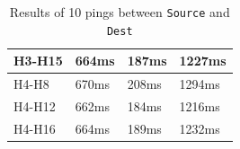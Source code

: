 \documentclass[a4paper, 11pt, oneside]{article}
\begin{document}
\begin{table}[H]
\begin{table}[H]
\begin{tabular}{|l|l|l|l|}
    H3-H15                                      & 664ms                              & 187ms                              & 1227ms                                 \\ \hline
    H4-H8                                    & 670ms                              & 208ms                              & 1294ms                                 \\ \hline
    H4-H12                                     & 662ms                              & 184ms                              & 1216ms                                 \\ \hline
    H4-H16                                     & 664ms                              & 189ms                              & 1232ms                                 \\ \hline
    \end{tabular}
    \caption{Results of 10 pings between \texttt{Source} and \texttt{Dest}}
    \label{table:VLANs_pings}
    \end{table}


\end{table}
\end{document}
